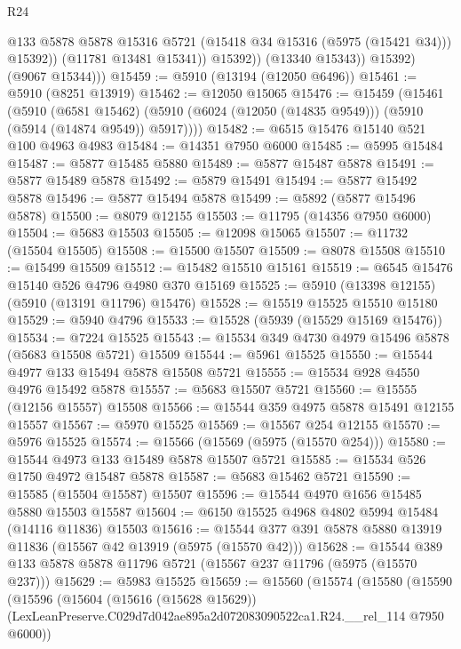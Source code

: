 \begin{lexlean}{R24}
\begin{coremodule}
                      @133
                      @5878
                      @5878
                      @15316
                      @5721
                      (@15418 @34 @15316 (@5975 (@15421 @34)))
                      @15392))
                  (@11781 @13481 @15341))
                @15392))
            (@13340 @15343))
          @15392)
        (@9067 @15344)))
@15459 := @5910 (@13194 (@12050 @6496))
@15461 := @5910 (@8251 @13919)
@15462 := @12050 @15065
@15476 := @15459
    (@15461
      (@5910
        (@6581 @15462)
        (@5910 (@6024 (@12050 (@14835 @9549))) (@5910 (@5914 (@14874 @9549)) @5917))))
@15482 := @6515 @15476 @15140 @521 @100 @4963 @4983
@15484 := @14351 @7950 @6000
@15485 := @5995 @15484
@15487 := @5877 @15485 @5880
@15489 := @5877 @15487 @5878
@15491 := @5877 @15489 @5878
@15492 := @5879 @15491
@15494 := @5877 @15492 @5878
@15496 := @5877 @15494 @5878
@15499 := @5892 (@5877 @15496 @5878)
@15500 := @8079 @12155
@15503 := @11795 (@14356 @7950 @6000)
@15504 := @5683 @15503
@15505 := @12098 @15065
@15507 := @11732 (@15504 @15505)
@15508 := @15500 @15507
@15509 := @8078 @15508
@15510 := @15499 @15509
@15512 := @15482 @15510 @15161
@15519 := @6545 @15476 @15140 @526 @4796 @4980 @370 @15169
@15525 := @5910 (@13398 @12155) (@5910 (@13191 @11796) @15476)
@15528 := @15519 @15525 @15510 @15180
@15529 := @5940 @4796
@15533 := @15528 (@5939 (@15529 @15169 @15476))
@15534 := @7224 @15525
@15543 := @15534 @349 @4730 @4979 @15496 @5878 (@5683 @15508 @5721) @15509
@15544 := @5961 @15525
@15550 := @15544 @4977 @133 @15494 @5878 @15508 @5721
@15555 := @15534 @928 @4550 @4976 @15492 @5878
@15557 := @5683 @15507 @5721
@15560 := @15555 (@12156 @15557) @15508
@15566 := @15544 @359 @4975 @5878 @15491 @12155 @15557
@15567 := @5970 @15525
@15569 := @15567 @254 @12155
@15570 := @5976 @15525
@15574 := @15566 (@15569 (@5975 (@15570 @254)))
@15580 := @15544 @4973 @133 @15489 @5878 @15507 @5721
@15585 := @15534 @526 @1750 @4972 @15487 @5878
@15587 := @5683 @15462 @5721
@15590 := @15585 (@15504 @15587) @15507
@15596 := @15544 @4970 @1656 @15485 @5880 @15503 @15587
@15604 := @6150 @15525 @4968 @4802 @5994 @15484 (@14116 @11836) @15503
@15616 := @15544 @377 @391 @5878 @5880 @13919 @11836 (@15567 @42 @13919 (@5975 (@15570 @42)))
@15628 := @15544 @389 @133 @5878 @5878 @11796 @5721 (@15567 @237 @11796 (@5975 (@15570 @237)))
@15629 := @5983 @15525
@15659 := @15560
    (@15574
      (@15580
        (@15590
          (@15596
            (@15604
              (@15616 (@15628 @15629))
              (LexLeanPreserve.C029d7d042ae895a2d072083090522ca1.R24.__rel_114 @7950 @6000))

\end{coremodule}
\end{lexlean}
